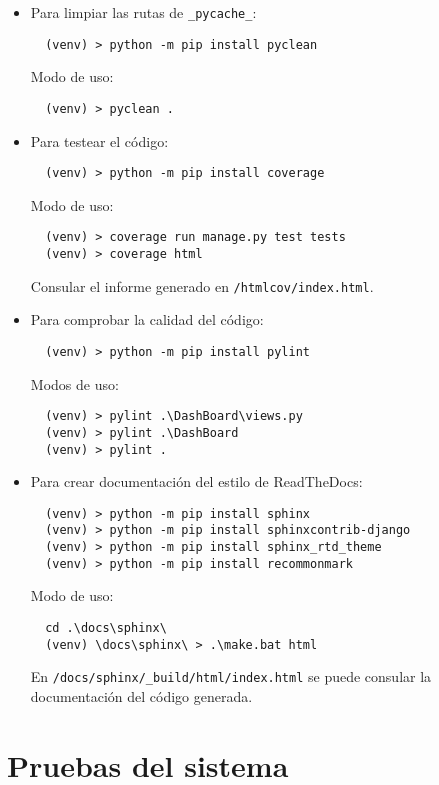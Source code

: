 \begin{itemize}

\item
Para limpiar las rutas de \texttt{\_pycache\_}:

\begin{verbatim}
  (venv) > python -m pip install pyclean
\end{verbatim}

Modo de uso:

\begin{verbatim}
  (venv) > pyclean .
\end{verbatim}

\item
Para testear el código:

\begin{verbatim}
  (venv) > python -m pip install coverage
\end{verbatim}

Modo de uso:

\begin{verbatim}
  (venv) > coverage run manage.py test tests
  (venv) > coverage html
\end{verbatim}


Consular el informe generado en \texttt{/htmlcov/index.html}.

\item
Para comprobar la calidad del código:

\begin{verbatim}
  (venv) > python -m pip install pylint
\end{verbatim}

Modos de uso:

\begin{verbatim}
  (venv) > pylint .\DashBoard\views.py
  (venv) > pylint .\DashBoard
  (venv) > pylint .
\end{verbatim}


\item
Para crear documentación del estilo de ReadTheDocs:

\begin{verbatim}
  (venv) > python -m pip install sphinx
  (venv) > python -m pip install sphinxcontrib-django
  (venv) > python -m pip install sphinx_rtd_theme
  (venv) > python -m pip install recommonmark
\end{verbatim}

Modo de uso:

\begin{verbatim}
  cd .\docs\sphinx\
  (venv) \docs\sphinx\ > .\make.bat html
\end{verbatim}

En \texttt{/docs/sphinx/\_build/html/index.html} se puede consular la documentación del código generada.

\end{itemize}


\section{Pruebas del sistema}
